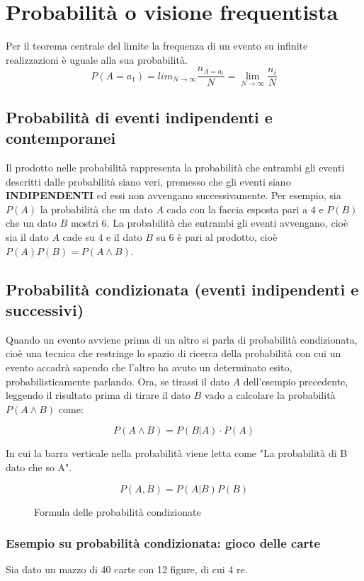 \documentclass[\main/main.tex]{subfiles}
\begin{document}
\section{Probabilità o visione frequentista}
Per il teorema centrale del limite la frequenza di un evento su infinite realizzazioni è uguale alla sua probabilità.
\[
  P(A=a_1) = lim_{N\rightarrow \infty} \dfrac{n_{A=a_i}}{N} = \lim_{N\rightarrow \infty} \dfrac{n_i}{N}
\]

\subsection{Probabilità di eventi indipendenti e contemporanei}
Il prodotto nelle probabilità rappresenta la probabilità che entrambi gli eventi descritti dalle probabilità siano veri, premesso che gli eventi siano \textbf{INDIPENDENTI} ed essi non avvengano successivamente.
Per esempio, sia $P(A)$ la probabilità che un dato $A$ cada con la faccia esposta pari a $4$ e $P(B)$ che un dato $B$ mostri $6$. La probabilità che entrambi gli eventi avvengano, cioè sia il dato $A$ cade su $4$ e il dato $B$ su $6$ è pari al prodotto, cioè $P(A)P(B) = P(A \wedge B)$.

\subsection{Probabilità condizionata (eventi indipendenti e successivi)}
Quando un evento avviene prima di un altro si parla di probabilità condizionata, cioè una tecnica che restringe lo spazio di ricerca della probabilità con cui un evento accadrà sapendo che l'altro ha avuto un determinato esito, probabilisticamente parlando. Ora, se tirassi il dato $A$ dell'esempio precedente, leggendo il risultato prima di tirare il dato $B$ vado a calcolare la probabilità $P(A \wedge B)$ come:

\[
  P(A \wedge B) = P(B | A) \cdot P(A)
\]

In cui la barra verticale nella probabilità viene letta come "La probabilità di B dato che so A".

\begin{figure}[H]
  \[
    P(A, B) = P(A|B) P(B)
  \]
  \caption{Formula delle probabilità condizionate}
\end{figure}

\subsubsection{Esempio su probabilità condizionata: gioco delle carte}
Sia dato un mazzo di 40 carte con 12 figure, di cui 4 re.
\end{document}
